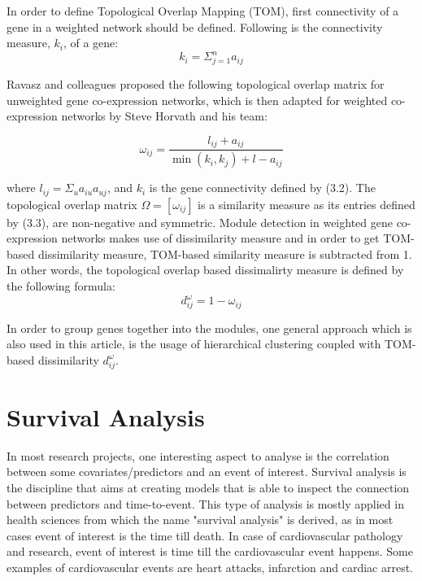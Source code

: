 \documentclass{ba-kecs}
\numberwithin{figure}{section}
\numberwithin{equation}{section}
\begin{document}
In order to define Topological Overlap Mapping (TOM), first connectivity of a gene in a weighted network should be defined. Following is the connectivity measure, $k_{i}$, of a gene:
\begin{equation}
k_i = \Sigma_{j=1}^n a_{ij}
\end{equation}

Ravasz and colleagues proposed the following topological overlap matrix for unweighted gene co-expression networks, which is then adapted for weighted co-expression networks by Steve Horvath and his team:

\begin{equation}
\omega _{ij} = \dfrac{l _{ij} + a_{ij}}{\min{(k_i,k_j)} + l - a_{ij}}
\end{equation}

where $l_{ij} = \Sigma_u a_{iu}a_{uj}$, and $k_i$ is the gene connectivity defined by (3.2).  The topological overlap matrix $\Omega = [\omega_{ij}]$ is a similarity measure as its entries defined by (3.3), are non-negative and symmetric. Module detection in weighted gene co-expression networks makes use of dissimilarity measure and in order to get TOM-based dissimilarity measure, TOM-based similarity measure is subtracted from 1. In other words, the topological overlap based dissimalirty measure is defined by the following formula:
\begin{equation}
d^{\omega}_{ij} = 1 - \omega_{ij}
\end{equation}

In order to group genes together into the modules, one general approach which is also used in this article, is the usage of hierarchical clustering coupled with TOM-based dissimilarity $d^{\omega}_{ij}$.

\section{Survival Analysis}
In most research projects, one interesting aspect to analyse is the correlation between some covariates/predictors and an event of interest. Survival analysis is the discipline that aims at creating models that is able to inspect the connection between predictors and time-to-event. This type of analysis is mostly applied in health sciences from which the name "survival analysis" is derived, as in most cases event of interest is the time till death. In case of cardiovascular pathology and research, event of interest is time till the cardiovascular event happens. Some examples of cardiovascular events are heart attacks, infarction and cardiac arrest.
\end{document}
